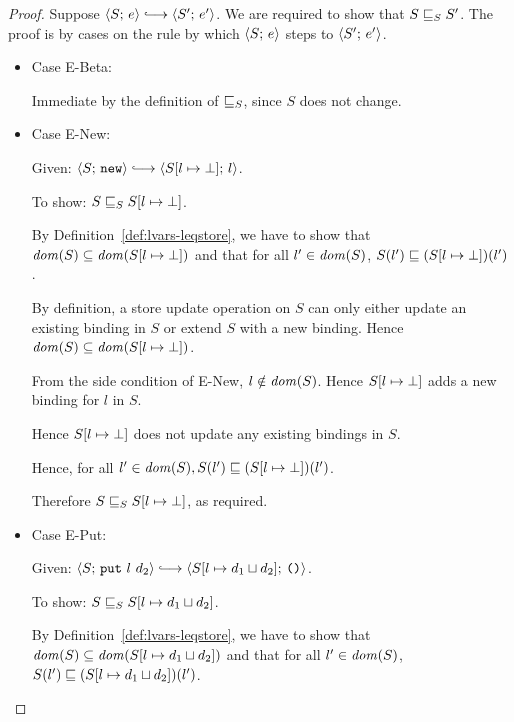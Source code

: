 \begin{proof}
  Suppose $\config{S}{e} \parstepsto \config{S'}{e'}$.  We are
  required to show that $S \sqsubseteq_S S'$.  The proof is by cases on
  the rule by which $\langle S;\, e \rangle$ steps to $\langle S';\, e' \rangle$.

  \begin{itemize}
    \item Case {\sc E-Beta}:

      Immediate by the definition of $ \sqsubseteq_S $, since $S$ does
      not change.

    \item Case {\sc E-New}:

      Given: $\config{S}{\NEW} \parstepsto
      \config{\extSRaw{S}{l}{\bot}}{l}$.

      To show: $S \sqsubseteq_S S[l \mapsto \bot]$.

      By Definition~\ref{def:lvars-leqstore}, we have to show that
      $\mathit{dom}(S) \subseteq \mathit{dom}(S[l \mapsto \bot])$ and
      that for all $l' \in \mathit{dom}(S)$, $S(l') \sqsubseteq
      (S[l \mapsto \bot])(l')$.

      By definition, a store update operation on $S$ can only either
      update an existing binding in $S$ or extend $S$ with a new
      binding.  Hence $\mathit{dom}(S) \subseteq \mathit{dom}(S[l \mapsto \bot])$.

      From the side condition of {\sc E-New}, $l \notin \mathit{dom}(S)$.
      Hence $S[l \mapsto \bot]$ adds a new binding for $l$ in $S$.

      Hence $S[l \mapsto \bot]$ does not update any existing
      bindings in $S$.

      Hence, for all $l' \in \mathit{dom}(S), S(l') \sqsubseteq
      (S[l \mapsto \bot])(l')$.

      Therefore $S \sqsubseteq_S S[l \mapsto \bot]$, as
      required.

    \item Case {\sc E-Put}:

      Given: $\config{S}{\putexp{l}{d_2}} \parstepsto
      \config{\extSRaw{S}{l}{\userlub{d_1}{d_2}}}{\unit}$.

      To show: $S \sqsubseteq_S S[l \mapsto d_1 \sqcup d_2]$.

      By Definition~\ref{def:lvars-leqstore}, we have to show that
      $\mathit{dom}(S) \subseteq \mathit{dom}(S[l \mapsto d_1 \sqcup d_2])$ and
      that for all $l' \in \mathit{dom}(S)$, $S(l') \sqsubseteq
      (S[l \mapsto d_1 \sqcup d_2])(l')$.


\end{itemize}
\end{proof}
